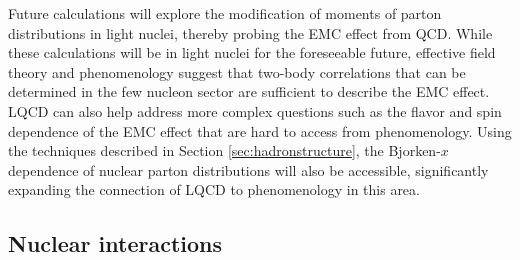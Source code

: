 Future calculations will explore the modification of moments of parton distributions in light nuclei, thereby probing the EMC effect from QCD. While these calculations will be in light nuclei for the foreseeable future, effective field theory \cite{Chen:2004zx,Chen:2016bde} and phenomenology \cite{Hen:2016kwk} suggest that two-body correlations that can be determined in the few nucleon sector are sufficient to describe the EMC effect. LQCD can also help address more complex questions such as the flavor and spin dependence of the EMC effect that are hard to access from phenomenology. Using the techniques described in Section \ref{sec:hadronstructure}, the Bjorken-$x$ dependence of nuclear parton distributions will also be accessible, significantly expanding the connection of LQCD to phenomenology in this area. 





\subsection{Nuclear interactions}


